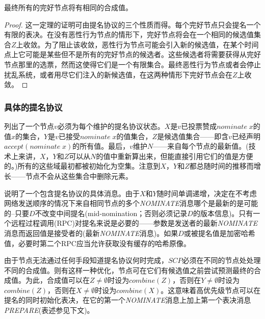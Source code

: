 \begin{theorem}\label{thm:intact_have_same_value}
	最终所有的完好节点将有相同的合成值。
\end{theorem}

\begin{proof}
	这一定理的证明可由提名协议的三个性质而得。每个完好节点只会提名一个有限的表决。在没有恶性行为节点的情形下，完好节点将会在一个相同的候选值集合$Z$上收敛。为了阻止该收敛，恶性行为节点可能会引入新的候选值，在某个时间点上它可能是某些但不是所有的完好节点的候选者。这些候选者将需要获得从完好节点那里的选票，然而这使得它们是一个有限集合。最终恶性行为节点或者会停止扰乱系统，或者用尽它们注入的新候选值，在这两种情形下完好节点会在$Z$上收敛。
\end{proof}

\subsubsection{具体的提名协议}

列出了一个节点$v$必须为每个{\slot}维护的提名协议状态。$X$是$v$已投票赞成$nominate\;x$的值$x$的集合，$Y$是$v$已接受$nominate\;x$的值集合，$Z$是候选值集合——即含$v${\quorum}已经声明$accept(nominate\;x)$的所有值。最后，$v$维护$N$——来自每个节点的最新值。(技术上来讲，$X$，$Y$和$Z$可以从$N$的值中重新算出来，但能直接引用它们的值是方便的。)所有的这些域最初都被初始化为空集。注意到$X$，$Y$和$Z$都总随时间的推移而增长——节点不会从这些集合中删除元素。

说明了一个包含提名协议的具体消息。由于$X$和$Y$随时间单调递增，决定在不考虑网络发送顺序的情况下来自相同节点的多个\textsl{NOMINATE}消息哪个是最新的是可能的--只要$D$不改变中间提名(mid-nomination；否则必须记录$D$的版本信息)。只有一个远程过程调用(RPC)对提名来说是必要的——参数是发送者的最新\textsl{NOMINATE}消息而返回值是接受者的(最新\textsl{NOMINATE}消息{})。如果$D$或被提名值是加密哈希值，必要时第二个RPC应当允许获取没有缓存的哈希原像。

由于节点无法通过任何手段知道提名协议何时完成，$SCP$必须在不同的节点处处理不同的合成值。则有这样一种优化，节点可在它们有候选值之前尝试预测最终的合成值。为此，合成值可以在$Z\neq \emptyset$时设为$combine(Z)$，否则在$Y\neq \emptyset$时设为$combine(Z)$，否则在$X\neq \emptyset$时设为$combine(X)$。这意味着高优先级节点可以在提名的同时初始化表决，在它的第一个\textsl{NOMINATE}消息上加上第一个表决消息\textsl{PREPARE}(表述参见下文)。